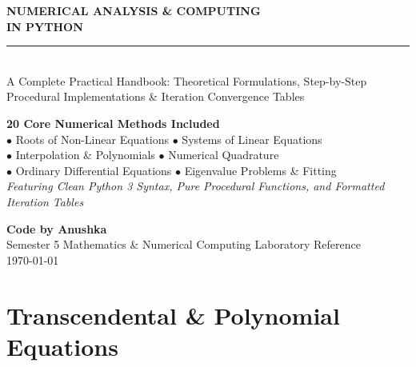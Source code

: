 \documentclass[10pt,a4paper]{report}
\begin{document}
\begin{titlepage}
\begin{center}
\vspace*{1.5cm}

{\Huge\bfseries\color{primary} NUMERICAL ANALYSIS \& COMPUTING}\\[0.4cm]
{\LARGE\bfseries\color{secondary} IN PYTHON}\\[0.8cm]

\textcolor{accentteal}{\rule{0.8\textwidth}{2.5pt}}\\[0.8cm]

{\Large\color{primary} A Complete Practical Handbook: Theoretical Formulations, Step-by-Step Procedural Implementations \& Iteration Convergence Tables}\\[1.5cm]

\begin{tcolorbox}[colback=codebg,colframe=secondary,width=0.88\textwidth,arc=4mm,boxrule=1.5pt]
\begin{center}
\textbf{\large\color{secondary} 20 Core Numerical Methods Included}\\[0.3cm]
\small\color{primary}
$\bullet$ Roots of Non-Linear Equations \quad $\bullet$ Systems of Linear Equations \\
$\bullet$ Interpolation \& Polynomials \quad $\bullet$ Numerical Quadrature \\
$\bullet$ Ordinary Differential Equations \quad $\bullet$ Eigenvalue Problems \& Fitting\\[0.2cm]
\textit{Featuring Clean Python 3 Syntax, Pure Procedural Functions, and Formatted Iteration Tables}
\end{center}
\end{tcolorbox}

\vfill

{\LARGE\textbf{\color{secondary}Code by Anushka}}\\[0.3cm]
{\small Semester 5 Mathematics \& Numerical Computing Laboratory Reference}\\[0.3cm]
{\small\today}

\end{center}
\end{titlepage}

\tableofcontents
\newpage
\chapter{Transcendental \& Polynomial Equations}
\end{document}
